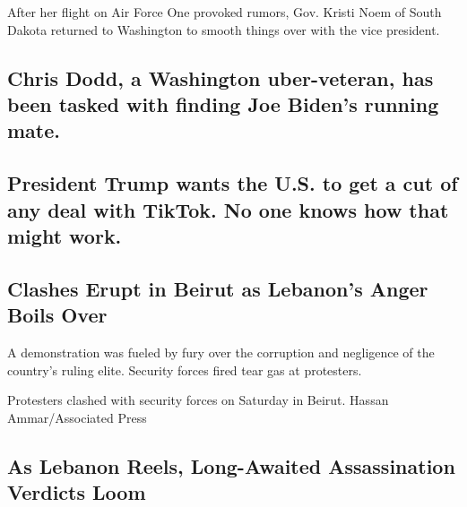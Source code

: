 After her flight on Air Force One provoked rumors, Gov. Kristi Noem of
South Dakota returned to Washington to smooth things over with the vice
president.

\href{/2020/08/08/us/politics/biden-vp-chris-dodd.html}{}

\hypertarget{chris-dodd-a-washington-uber-veteran-has-been-tasked-with-finding-joe-bidens-running-mate}{%
\subsection{Chris Dodd, a Washington uber-veteran, has been tasked with
finding Joe Biden's running
mate.}\label{chris-dodd-a-washington-uber-veteran-has-been-tasked-with-finding-joe-bidens-running-mate}}

\href{/2020/08/08/us/politics/trump-tiktok-deal-treasury.html}{}

\hypertarget{president-trump-wants-the-us-to-get-a-cut-of-any-deal-with-tiktok-no-one-knows-how-that-might-work}{%
\subsection{President Trump wants the U.S. to get a cut of any deal with
TikTok. No one knows how that might
work.}\label{president-trump-wants-the-us-to-get-a-cut-of-any-deal-with-tiktok-no-one-knows-how-that-might-work}}

\href{/2020/08/08/world/middleeast/Beirut-explosion-protests-lebanon.html}{}

\hypertarget{clashes-erupt-in-beirut-as-lebanons-anger-boils-over}{%
\subsection{Clashes Erupt in Beirut as Lebanon's Anger Boils
Over}\label{clashes-erupt-in-beirut-as-lebanons-anger-boils-over}}

A demonstration was fueled by fury over the corruption and negligence of
the country's ruling elite. Security forces fired tear gas at
protesters.

\href{/2020/08/08/world/middleeast/Beirut-explosion-protests-lebanon.html}{}

Protesters clashed with security forces on Saturday in Beirut. Hassan
Ammar/Associated Press

\href{/2020/08/08/world/middleeast/hariri-assassination-trial-hague.html}{}

\hypertarget{as-lebanon-reels-long-awaited-assassination-verdicts-loom}{%
\subsection{As Lebanon Reels, Long-Awaited Assassination Verdicts
Loom}\label{as-lebanon-reels-long-awaited-assassination-verdicts-loom}}

